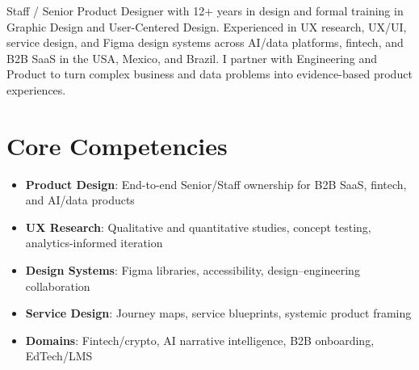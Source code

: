 \documentclass[11pt,a4paper,sans]{moderncv}
\begin{document}
\makecvtitle

\vspace{6pt}
\small{Staff / Senior Product Designer with 12+ years in design and formal training in Graphic Design and User-Centered Design. Experienced in UX research, UX/UI, service design, and Figma design systems across AI/data platforms, fintech, and B2B SaaS in the USA, Mexico, and Brazil. I partner with Engineering and Product to turn complex business and data problems into evidence-based product experiences.}

\section{Core Competencies}
\vspace{1pt}
\begin{itemize}
\item \textbf{Product Design}: End-to-end Senior/Staff ownership for B2B SaaS, fintech, and AI/data products
\item \textbf{UX Research}: Qualitative and quantitative studies, concept testing, analytics-informed iteration
\item \textbf{Design Systems}: Figma libraries, accessibility, design--engineering collaboration
\item \textbf{Service Design}: Journey maps, service blueprints, systemic product framing
\item \textbf{Domains}: Fintech/crypto, AI narrative intelligence, B2B onboarding, EdTech/LMS
\end{itemize}
\end{document}
